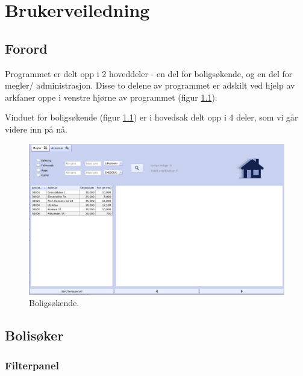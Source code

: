 \chapter{Brukerveiledning}

%
%




\section{Forord}
Programmet er delt opp i 2 hoveddeler - en del for boligsøkende, og en del for megler/
administrasjon. Disse to delene av programmet er adskilt ved hjelp av arkfaner oppe i venstre
hjørne av programmet (figur \ref{fig:bv:1}).

Vinduet for boligsøkende (figur \ref{fig:bv:1}) er i hovedsak delt opp i 4 deler, som vi går videre inn på nå.




\begin{figure}[h!]
 \includegraphics[width=\textwidth,height=\textheight,keepaspectratio]{./img/brukerveiledning/1.png}
 \caption{Boligsøkende.}
 \label{fig:bv:1}
\end{figure}





\section{Bolisøker}



\subsection{Filterpanel}

